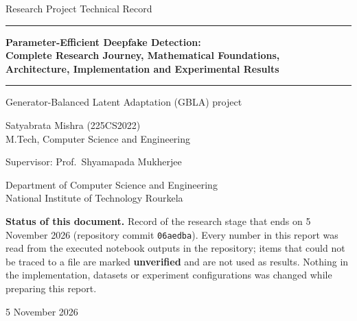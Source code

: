 \documentclass[10pt,a4paper]{article}
\newcommand{\Unv}{\textcolor{fail}{\textbf{unverified}}}
\begin{document}
\begin{titlepage}
\centering
\vspace*{1.2cm}
{\large Research Project Technical Record \par}
\vspace{0.8cm}
\rule{\linewidth}{1pt}\par\vspace{0.4cm}
{\LARGE\bfseries Parameter-Efficient Deepfake Detection:\\[4pt]
Complete Research Journey, Mathematical Foundations,\\[4pt]
Architecture, Implementation and Experimental Results\par}
\vspace{0.4cm}\rule{\linewidth}{1pt}\par
\vspace{0.8cm}
{\large Generator-Balanced Latent Adaptation (GBLA) project\par}
\vspace{1.4cm}
{\large Satyabrata Mishra (225CS2022)\\ M.Tech, Computer Science and Engineering\par}
\vspace{0.4cm}
{\large Supervisor: Prof.\ Shyamapada Mukherjee\par}
\vspace{0.4cm}
{\large Department of Computer Science and Engineering\\
National Institute of Technology Rourkela\par}
\vfill
\begin{minipage}{0.86\linewidth}\small
\textbf{Status of this document.} Record of the research stage that ends on 5 November 2026
(repository commit \texttt{06aedba}). Every number in this report was read from the executed
notebook outputs in the repository; items that could not be traced to a file are marked
\Unv{} and are not used as results. Nothing in the implementation, datasets or experiment
configurations was changed while preparing this report.
\end{minipage}
\vspace{0.8cm}

{\large 5 November 2026\par}
\end{titlepage}

\end{document}
